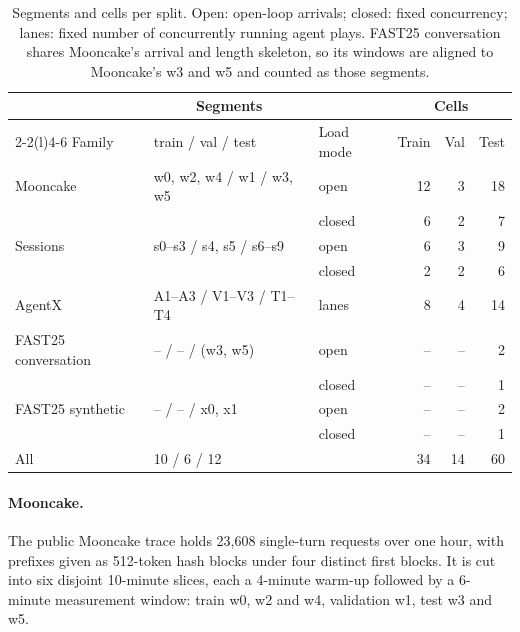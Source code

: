 \begin{table}[tbp]
  \centering\small
  \caption{Segments and cells per split. Open: open-loop arrivals; closed: fixed concurrency;
    lanes: fixed number of concurrently running agent plays. FAST25 conversation shares Mooncake's
    arrival and length skeleton, so its windows are aligned to Mooncake's w3 and w5 and counted
    as those segments.}
  \label{tab:families}
  \begin{tabular}{@{}lllrrr@{}}
    \toprule
    & \multicolumn{1}{c}{Segments} & & \multicolumn{3}{c}{Cells} \\
    \cmidrule(lr){2-2}\cmidrule(l){4-6}
    Family & train / val / test & Load mode & Train & Val & Test \\
    \midrule
    Mooncake            & w0, w2, w4 / w1 / w3, w5 & open   & 12 & 3 & 18 \\
                        &                          & closed & 6  & 2 & 7  \\
    Sessions            & s0--s3 / s4, s5 / s6--s9 & open   & 6  & 3 & 9  \\
                        &                          & closed & 2  & 2 & 6  \\
    AgentX              & A1--A3 / V1--V3 / T1--T4 & lanes  & 8  & 4 & 14 \\
    FAST25 conversation & -- / -- / (w3, w5)       & open   & -- & -- & 2 \\
                        &                          & closed & -- & -- & 1 \\
    FAST25 synthetic    & -- / -- / x0, x1         & open   & -- & -- & 2 \\
                        &                          & closed & -- & -- & 1 \\
    \midrule
    All                 & 10 / 6 / 12              &        & 34 & 14 & 60 \\
    \bottomrule
  \end{tabular}
\end{table}

\paragraph{Mooncake.}
The public Mooncake trace \citep{mooncake} holds 23,608 single-turn requests over one
hour, with prefixes given as 512-token hash blocks under four distinct first blocks. It is cut
into six disjoint 10-minute slices, each a 4-minute warm-up followed by a 6-minute measurement
window: train w0, w2 and w4, validation w1, test w3 and w5.

